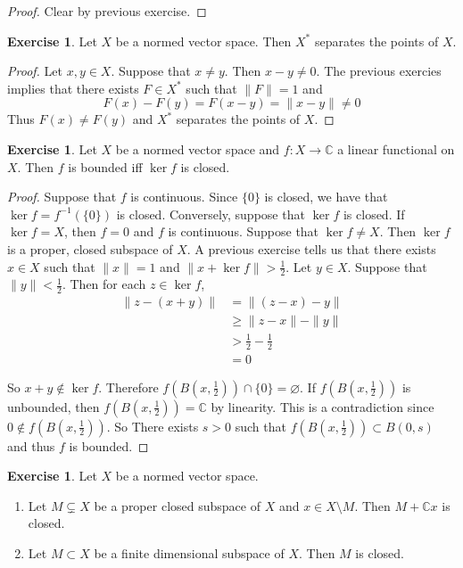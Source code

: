 \documentclass[12pt]{amsart}
\theoremstyle{definition}
\newtheorem{ex}[definition]{Exercise}
\newcommand{\C}{\mathbb{C}}
\newcommand{\lex}[1]{\label{ex:#1}}
\begin{document}
	\begin{proof}
	Clear by previous exercise.
\end{proof}		
		
	\begin{ex} \lex{55020}
		Let $X$ be a normed vector space. Then $X^*$ separates the points of $X$. 
	\end{ex}
	
	\begin{proof}
		Let $x, y \in X$. Suppose that $x \neq y$. Then $x-y \neq 0$. The previous exercies implies that there exists $F \in X^*$ such that $\|F \|= 1$ and $$F(x) - F(y) = F(x-y) = \|x-y \|\neq 0$$ Thus $F(x) \neq F(y)$ and $X^*$ separates the points of $X$.
	\end{proof}
	
	
	\begin{ex} \lex{55021}
		Let $X$ be a normed vector space and $f:X \rightarrow \C$ a linear functional on $X$. Then $f$ is bounded iff $\ker f$ is closed. 
	\end{ex}
	
	\begin{proof}
		Suppose that $f$ is continuous. Since $\{0\}$ is closed, we have that $\ker f = f^{-1}(\{0\})$ is closed. Conversely, suppose that $\ker f$ is closed. If $\ker f = X$, then $f =0$ and $f$ is continuous. Suppose that $\ker f \neq X$. Then $\ker f$ is a proper, closed subspace of $X$. A previous exercise tells us that there exists $x \in X$ such that $\|x \|= 1$ and $\|x + \ker f \|> \frac{1}{2}$. Let $y \in X$. Suppose that $\|y \|< \frac{1}{2}$. Then for each $z \in \ker f$, 
		\begin{align*}
			\|z -  (x+y)\|
			& = \|(z-x) -y \|\\
			& \geq \|z-x \|- \|y \|\\
			& > \frac{1}{2} - \frac{1}{2} \\
			&=0
		\end{align*}
		
		So $x+y \not \in \ker f$. Therefore $f(B(x,\frac{1}{2})) \cap \{0\} = \varnothing$. If $f(B(x,\frac{1}{2})) $ is unbounded, then $f(B(x,\frac{1}{2})) = \C$ by linearity. This is a contradiction since $0 \not \in f(B(x,\frac{1}{2}))$. So There exists $s > 0$ such that $f(B(x,\frac{1}{2})) \subset B(0,s)$ and thus $f$ is bounded. 
	\end{proof}
	
	\begin{ex} \lex{55022}
		Let $X$ be a normed vector space. 
		\begin{enumerate}
			\item Let $M \subsetneq X$ be a proper closed subspace of $X$ and $x \in X \setminus M$. Then $M + \C x$ is closed.
			\item Let $M \subset X$ be a finite dimensional subspace of $X$. Then $M$ is closed.
		\end{enumerate}
	\end{ex}
	
\end{document}
